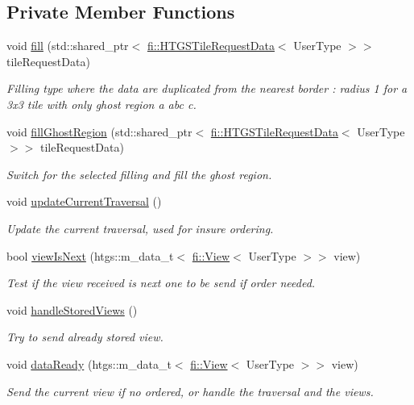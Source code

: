 \subsection*{Private Member Functions}
\begin{DoxyCompactItemize}
\item 
void \hyperlink{classfi_1_1ViewCounter_ae583cf9ca69170e595208b2c4066c767}{fill} (std\+::shared\+\_\+ptr$<$ \hyperlink{classfi_1_1HTGSTileRequestData}{fi\+::\+H\+T\+G\+S\+Tile\+Request\+Data}$<$ User\+Type $>$$>$ tile\+Request\+Data)
\begin{DoxyCompactList}\small\item\em Filling type where the data are duplicated from the nearest border \+: radius 1 for a 3x3 tile with only ghost region a abc c. \end{DoxyCompactList}\item 
void \hyperlink{classfi_1_1ViewCounter_a9b208c1ff386265adc30d4e338dbc2c8}{fill\+Ghost\+Region} (std\+::shared\+\_\+ptr$<$ \hyperlink{classfi_1_1HTGSTileRequestData}{fi\+::\+H\+T\+G\+S\+Tile\+Request\+Data}$<$ User\+Type $>$$>$ tile\+Request\+Data)
\begin{DoxyCompactList}\small\item\em Switch for the selected filling and fill the ghost region. \end{DoxyCompactList}\item 
void \hyperlink{classfi_1_1ViewCounter_a8a1bd60b42035140d6abee7e58fc3561}{update\+Current\+Traversal} ()
\begin{DoxyCompactList}\small\item\em Update the current traversal, used for insure ordering. \end{DoxyCompactList}\item 
bool \hyperlink{classfi_1_1ViewCounter_a30a0d5ae3d727aea55e70ee4eb45127f}{view\+Is\+Next} (htgs\+::m\+\_\+data\+\_\+t$<$ \hyperlink{classfi_1_1View}{fi\+::\+View}$<$ User\+Type $>$$>$ view)
\begin{DoxyCompactList}\small\item\em Test if the view received is next one to be send if order needed. \end{DoxyCompactList}\item 
void \hyperlink{classfi_1_1ViewCounter_a6941e894f768fe1f0deb1b7ff771e2bc}{handle\+Stored\+Views} ()
\begin{DoxyCompactList}\small\item\em Try to send already stored view. \end{DoxyCompactList}\item 
void \hyperlink{classfi_1_1ViewCounter_a20e96bdb97f1aecc5bb0a81fb456c0fc}{data\+Ready} (htgs\+::m\+\_\+data\+\_\+t$<$ \hyperlink{classfi_1_1View}{fi\+::\+View}$<$ User\+Type $>$$>$ view)
\begin{DoxyCompactList}\small\item\em Send the current view if no ordered, or handle the traversal and the views. \end{DoxyCompactList}\end{DoxyCompactItemize}
